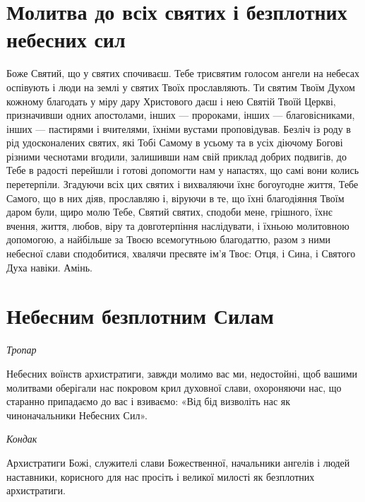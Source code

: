 \documentclass[chapters.tex]{subfiles}
\begin{document}
\section{Молитва до всіх святих і безплотних небесних сил}
Боже Святий, що у святих спочиваєш. Тебе трисвятим голосом ангели на небесах оспівують і люди на землі у святих Твоїх прославляють. Ти святим Твоїм Духом кожному благодать у міру дару Христового даєш і нею Святій Твоїй Церкві, призначивши одних апостолами, інших — пророками, інших — благовісниками, інших — пастирями і вчителями, їхніми вустами проповідував. Безліч із роду в рід удосконалених святих, які Тобі Самому в усьому та в усіх діючому Богові різними чеснотами вгодили, залишивши нам свій приклад добрих подвигів, до Тебе в радості перейшли і готові допомогти нам у напастях, що самі вони колись перетерпіли. Згадуючи всіх цих святих і вихваляючи їхнє богоугодне життя, Тебе Самого, що в них діяв, прославляю і, віруючи в те, що їхні благодіяння Твоїм даром були, щиро молю Тебе, Святий святих, сподоби мене, грішного, їхнє вчення, життя, любов, віру та довготерпіння наслідувати, і їхньою молитовною допомогою, а найбільше за Твоєю всемогутньою благодаттю, разом з ними небесної слави сподобитися, хвалячи пресвяте ім’я Твоє: Отця, і Сина, і Святого Духа навіки. Амінь.

\section{Небесним безплотним Силам}
\emph{Тропар}

Небесних воїнств архистратиги, завжди молимо вас ми, недостойні, щоб вашими молитвами оберігали нас покровом крил духовної слави, охороняючи нас, що старанно припадаємо до вас і взиваємо: «Від бід визволіть нас як чиноначальники Небесних Сил».

\emph{Кондак}

Архистратиги Божі, служителі слави Божественної, начальники ангелів і людей наставники, корисного для нас просіть і великої милості як безплотних архистратиги.
\end{document}
